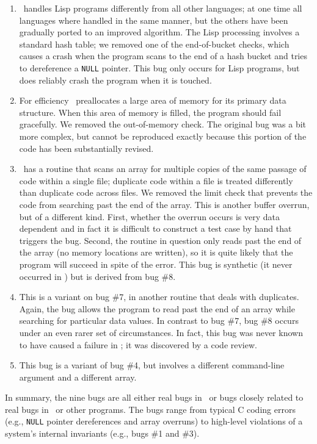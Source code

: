 \begin{enumerate}
\item \moss\ handles Lisp programs differently from all other languages;
at one time all languages where handled in the same manner, but the
others have been gradually ported to an improved algorithm.  The Lisp
processing involves a standard hash table; we removed one of the
end-of-bucket checks, which causes a crash when the program scans to
the end of a hash bucket and tries to dereference a \texttt{NULL} pointer.  This
bug only occurs for Lisp programs, but does reliably crash the program
when it is touched.

\item For efficiency \moss\ preallocates a large area of memory for its primary data structure.
When this area of memory is filled, the program should fail
gracefully.  We removed the out-of-memory check.  The original bug
was a bit more complex, but cannot be reproduced exactly because this
portion of the code has been substantially revised.  

\item \moss\ has a routine that scans an array for multiple copies of the same passage of code within
a single file; duplicate code within a file is treated differently than duplicate code across files.
We removed the limit check that prevents the code from searching past the end of the array.  This is another
buffer overrun, but of a different kind.  First, whether the overrun occurs is very data dependent and in fact it is
difficult to construct a test case by hand that triggers the bug.  Second, the routine in question only reads
past the end of the array (no memory locations are written), so it is quite likely that the program will
succeed in spite of the error.  This bug is synthetic (it never occurred in \moss) but is derived from bug \#8.

\item This is a variant on bug \#7, in another routine that deals with duplicates.
Again, the bug allows the program to read past the end of an array
while searching for particular data values.  In contrast to bug \#7,
bug \#8 occurs under an even rarer set of circumstances.  In
fact, this bug was never known to have caused a failure in \moss; it
was discovered by a code review.

\item This bug is a variant of bug \#4, but involves a different command-line argument and
a different array.
\end{enumerate}

In summary, the nine bugs are all either real bugs in \moss\ or bugs
closely related to real bugs in \moss\ or other programs.  The bugs
range from typical C coding errors (e.g., \texttt{NULL} pointer dereferences
and array overruns) to high-level violations of a system's internal
invariants (e.g., bugs \#1 and \#3).


